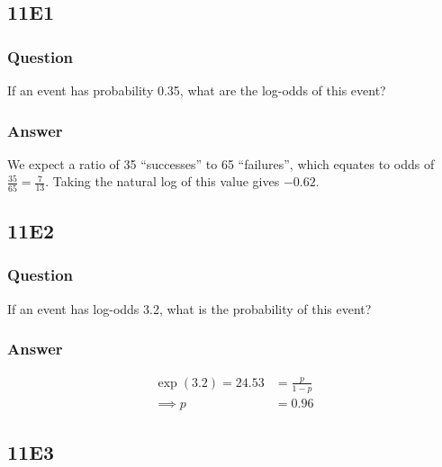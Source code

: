 \documentclass[
]{book}
\begin{document}
\hypertarget{e1-8}{%
\subsection*{11E1}\label{e1-8}}

\hypertarget{question-81}{%
\subsubsection*{Question}\label{question-81}}

If an event has probability 0.35, what are the log-odds of this event?

\hypertarget{answer-81}{%
\subsubsection*{Answer}\label{answer-81}}

We expect a ratio of 35 ``successes'' to 65 ``failures'', which equates to odds of \(\frac{35}{65} = \frac{7}{13}\). Taking the natural log of this value gives \(-0.62\).

\hypertarget{e2-6}{%
\subsection*{11E2}\label{e2-6}}

\hypertarget{question-82}{%
\subsubsection*{Question}\label{question-82}}

If an event has log-odds 3.2, what is the probability of this event?

\hypertarget{answer-82}{%
\subsubsection*{Answer}\label{answer-82}}

\[
\begin{aligned}
\exp(3.2) = 24.53 &= \frac{p}{1-p} \\
\implies p &= 0.96
\end{aligned}
\]

\hypertarget{e3-7}{%
\subsection*{11E3}\label{e3-7}}
\end{document}

